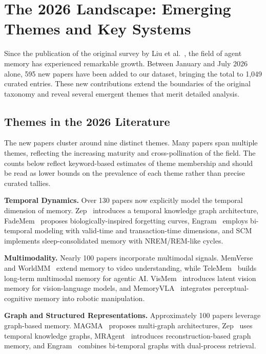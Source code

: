 \section{The 2026 Landscape: Emerging Themes and Key Systems}
\label{sec:landscape}

Since the publication of the original survey by Liu et al.~\cite{Unknown2025MemoryAgeAIAgents}, the field of agent memory has experienced remarkable growth. Between January and July 2026 alone, 595 new papers have been added to our dataset, bringing the total to 1,049 curated entries. These new contributions extend the boundaries of the original taxonomy and reveal several emergent themes that merit detailed analysis.

\subsection{Themes in the 2026 Literature}

The new papers cluster around nine distinct themes. Many papers span multiple themes, reflecting the increasing maturity and cross-pollination of the field. The counts below reflect keyword-based estimates of theme membership and should be read as lower bounds on the prevalence of each theme rather than precise curated tallies.

\textbf{Temporal Dynamics.} Over 130 papers now explicitly model the temporal dimension of memory. Zep~\cite{Unknown2025Zep} introduces a temporal knowledge graph architecture, FadeMem~\cite{Unknown2026FadeMem} proposes biologically-inspired forgetting curves, Engram~\cite{Unknown2026Engram} employs bi-temporal modeling with valid-time and transaction-time dimensions, and SCM~\cite{Unknown2026SCM} implements sleep-consolidated memory with NREM/REM-like cycles.

\textbf{Multimodality.} Nearly 100 papers incorporate multimodal signals. MemVerse~\cite{Unknown2025MemVerse} and WorldMM~\cite{Unknown2025WorldMM} extend memory to video understanding, while TeleMem~\cite{Unknown2026TeleMem} builds long-term multimodal memory for agentic AI. VisMem~\cite{Unknown2025VisMem} introduces latent vision memory for vision-language models, and MemoryVLA~\cite{Unknown2025MemoryVLA} integrates perceptual-cognitive memory into robotic manipulation.

\textbf{Graph and Structured Representations.} Approximately 100 papers leverage graph-based memory. MAGMA~\cite{Unknown2026MAGMA} proposes multi-graph architectures, Zep~\cite{Unknown2025Zep} uses temporal knowledge graphs, MRAgent~\cite{Unknown2026MRAgent} introduces reconstruction-based graph memory, and Engram~\cite{Unknown2026Engram} combines bi-temporal graphs with dual-process retrieval.

